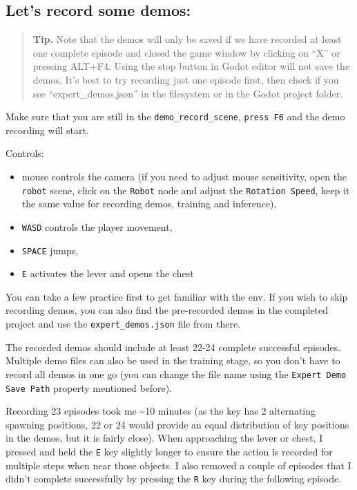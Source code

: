 \documentclass[11pt,a4paper]{article}
\begin{document}
\subsection{Let's record some demos:}\label{lets-record-some-demos}

\begin{quote}
\textbf{Tip.} Note that the demos will only be saved if we have recorded at least one complete episode and closed the game window by clicking on ``X'' or pressing ALT+F4. Using the stop button in Godot editor will not save the demos. It's best to try recording just one episode first, then check if you see ``expert\_demos.json'' in the filesystem or in the Godot project folder.
\end{quote}

Make sure that you are still in the \passthrough{\lstinline!demo_record_scene!}, \passthrough{\lstinline!press F6!} and the demo recording will start.

Controls:

\begin{itemize}
\tightlist
\item
  mouse controls the camera (if you need to adjust mouse sensitivity, open the \passthrough{\lstinline!robot!} scene, click on the \passthrough{\lstinline!Robot!} node and adjust the \passthrough{\lstinline!Rotation Speed!}, keep it the same value for recording demos, training and inference),
\item
  \passthrough{\lstinline!WASD!} controls the player movement,
\item
  \passthrough{\lstinline!SPACE!} jumps,
\item
  \passthrough{\lstinline!E!} activates the lever and opens the chest
\end{itemize}

You can take a few practice first to get familiar with the env. If you wish to skip recording demos, you can also find the pre-recorded demos in the completed project and use the \passthrough{\lstinline!expert_demos.json!} file from there.

The recorded demos should include at least 22-24 complete successful episodes. Multiple demo files can also be used in the training stage, so you don't have to record all demos in one go (you can change the file name using the \passthrough{\lstinline!Expert Demo Save Path!} property mentioned before).

Recording 23 episodes took me \textasciitilde10 minutes (as the key has 2 alternating spawning positions, 22 or 24 would provide an equal distribution of key positions in the demos, but it is fairly close). When approaching the lever or chest, I pressed and held the \passthrough{\lstinline!E!} key slightly longer to ensure the action is recorded for multiple steps when near those objects. I also removed a couple of episodes that I didn't complete successfully by pressing the \passthrough{\lstinline!R!} key during the following episode.
\end{document}
